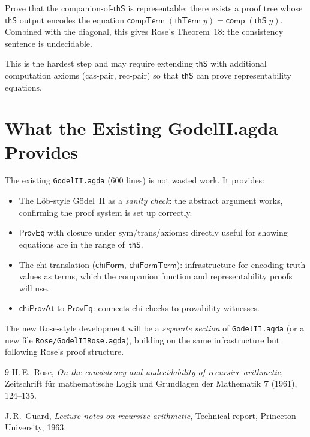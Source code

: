 \documentclass[11pt]{article}
\newcommand{\thS}{\mathsf{thS}}
\newcommand{\thTerm}{\mathsf{thTerm}}
\newcommand{\ProvEq}{\mathsf{ProvEq}}
\newcommand{\comp}{\mathsf{comp}}
\begin{document}
Prove that the companion-of-$\thS$ is representable: there exists
a proof tree whose $\thS$ output encodes the equation
$\mathsf{compTerm}\;(\thTerm\;y) = \comp\;(\thS\;y)$.
Combined with the diagonal, this gives Rose's Theorem~18:
the consistency sentence is undecidable.

This is the hardest step and may require extending $\thS$ with
additional computation axioms (cas-pair, rec-pair) so that
$\thS$ can prove representability equations.


\section{What the Existing GodelII.agda Provides}

The existing \texttt{GodelII.agda} (600 lines) is not wasted work.
It provides:

\begin{itemize}
\item The L\"ob-style G\"odel~II as a \emph{sanity check}: the
  abstract argument works, confirming the proof system is set up
  correctly.
\item $\ProvEq$ with closure under sym/trans/axioms: directly
  useful for showing equations are in the range of~$\thS$.
\item The chi-translation ($\mathsf{chiForm}$, $\mathsf{chiFormTerm}$):
  infrastructure for encoding truth values as terms, which the
  companion function and representability proofs will use.
\item $\mathsf{chiProvAt}$-to-$\ProvEq$: connects chi-checks to
  provability witnesses.
\end{itemize}

\noindent
The new Rose-style development will be a \emph{separate section}
of \texttt{GodelII.agda} (or a new file \texttt{Rose/GodelIIRose.agda}),
building on the same infrastructure but following Rose's proof
structure.


\begin{thebibliography}{9}
H.\,E.\ Rose,
\emph{On the consistency and undecidability of recursive arithmetic},
Zeitschrift f\"ur mathematische Logik und Grundlagen der Mathematik
\textbf{7} (1961), 124--135.

J.\,R.\ Guard,
\emph{Lecture notes on recursive arithmetic},
Technical report, Princeton University, 1963.
\end{thebibliography}
\end{document}
